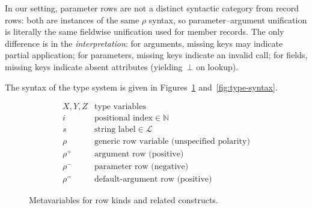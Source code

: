 \noindent
In our setting, parameter rows are not a distinct syntactic category from record rows: both are instances of the same $\rho$ syntax, so parameter–argument unification is literally the same fieldwise unification used for member records.  
The only difference is in the \emph{interpretation}:
for arguments, missing keys may indicate partial application;
for parameters, missing keys indicate an invalid call;
for fields, missing keys indicate absent attributes (yielding~$\bot$ on lookup).

The syntax of the type system is given in Figures~\ref{fig:metavars} and~\ref{fig:type-syntax}.
\newcommand{\rpos}{\mathord{\rho^{+}}}   %
\newcommand{\rneg}{\mathord{\rho^{-}}}   %
\newcommand{\rdef}{\mathord{\rho^{=}}}   %
\newcommand{\rowany}{\mathord{\rho}}     %

\begin{figure}[t]
\centering
\[
\begin{array}{ll}
X, Y, Z & \text{type variables} \\
i & \text{positional index} \in \mathbb{N} \\
s & \text{string label} \in \mathcal{L} \\
\rho & \text{generic row variable (unspecified polarity)} \\
\rpos & \text{argument row (positive)} \\
\rneg & \text{parameter row (negative)} \\
\rdef & \text{default-argument row (positive)}
\end{array}
\]
\caption{Metavariables for row kinds and related constructs.}
\label{fig:metavars}
\end{figure}

